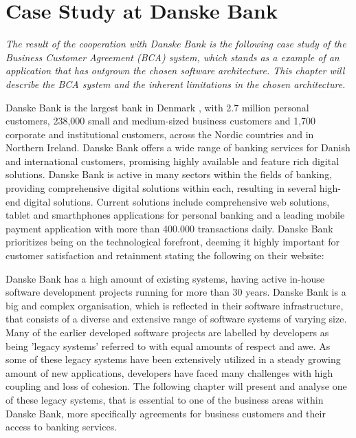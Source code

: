 \chapter{Case Study at Danske Bank}
\textit{The result of the cooperation with Danske Bank is the following case study of the Business Customer Agreement (BCA) system, which stands as a example of an application that has outgrown the chosen software architecture. This chapter will describe the BCA system and the inherent limitations in the chosen architecture.}

Danske Bank is the largest bank in Denmark \cite[p.~38]{danske_bank_setting_up_in_denmark}, with 2.7 million personal customers, 238,000 small and medium-sized business customers and 1,700 corporate and institutional customers, across the Nordic countries and in Northern Ireland. Danske Bank offers a wide range of banking services for Danish and international customers, promising highly available and feature rich digital solutions. Danske Bank is active in many sectors within the fields of banking, providing comprehensive digital solutions within each, resulting in several high-end digital solutions. Current solutions include comprehensive web solutions, tablet and smarthphones applications for personal banking and a leading mobile payment application with more than 400.000 transactions daily. Danske Bank prioritizes being on the technological forefront, deeming it highly important for customer satisfaction and retainment stating the following on their website\cite{danske_bank_our_essence}:



Danske Bank has a high amount of existing systems, having active in-house software development projects running for more than 30 years. Danske Bank is a big and complex organisation, which is reflected in their software infrastructure, that consists of a diverse and extensive range of software systems of varying size. Many of the earlier developed software projects are labelled by developers as being 'legacy systems' referred to with equal amounts of respect and awe. As some of these legacy systems have been extensively utilized in a steady growing amount of new applications, developers have faced many challenges with high coupling and loss of cohesion. The following chapter will present and analyse one of these legacy systems, that is essential to one of the business areas within Danske Bank, more specifically agreements for business customers and their access to banking services.


